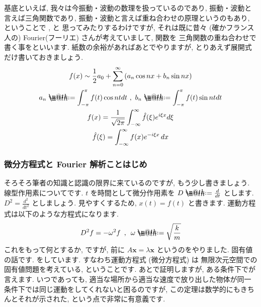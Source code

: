 \documentclass[openany, a4paper, oneside]{jsbook}
\makeatletter
\newcommand*{\defeq}{\mathrel{\rlap{%
\raisebox{0.3ex}{$\m@th\cdot$}}%
\raisebox{-0.3ex}{$\m@th\cdot$}}%
=}
\theoremstyle{break}
\theoremstyle{breakdefn}
\makeatother
\begin{document}
基底といえば, 我々は今振動・波動の数理を扱っているのであり, 振動・波動と言えば三角関数であり,
振動・波動と言えば重ね合わせの原理というのもあり, ということで
, と
思ってみたりするわけですが, それは既に昔々 (確かフランス人の) Fourier(フーリエ) さんが考えていまして, 関数を
三角関数の重ね合わせで書く事をといいます.
紙数の余裕があればあとでやりますが, とりあえず展開式だけ書いておきましょう.
\begin{gather}
f (x)
\sim
\frac{1}{2}a_0 + \sum_{n=0}^{\infty} \left ( a_n \cos nx + b_n \sin nx  \right) \\
a_n \defeq \int_{-\pi}^{\pi}f (t)\cos n t dt \,\, , \,\,
b_n \defeq \int_{-\pi}^{\pi}f (t)\sin n t dt \\
f (x)
=
\frac{1}{ \sqrt{ 2 \pi } } \int_{-\infty}^{\infty}  \hat{f}( \xi ) e^{i\xi x}d\xi \\
\hat{f}(\xi)
=
\int_{-\infty}^{\infty} f (x) e^{-i \xi x} \, dx
\end{gather}
\subsubsection{微分方程式と Fourier 解析ことはじめ}


そろそろ筆者の知識と認識の限界に来ているのですが, もう少し書きましょう.
線型作用素についてです.  $t$ を時間として微分作用素を $D\defeq\frac{d}{dt}$ とします.
 $D^2=\frac{d^2}{dt^2}$ としましょう.
見やすくするため,  $x (t) = f (t)$ と書きます. 運動方程式は以下のような方程式になります.
    \begin{align}
        D^2f = -\omega ^{2} f \,\,\, , \,\,\, \omega \defeq \sqrt{\frac{k}{m}}
    \end{align}
これをもって何とするか, ですが, 前に $A\bm{x}=\lambda \bm{x}$ というのをやりました.
固有値の話です. をしています. すなわち運動方程式 (微分方程式) は
無限次元空間での固有値問題を考えている, ということです.
あとで証明しますが, ある条件下でが言えます.
いつであっても, 適当な場所から適当な速度で放り出した物体が同一条件下では同じ運動をしてくれないと困るのですが,
この定理は数学的にもきちんとそれが示された, という点で非常に有意義です.
\end{document}
